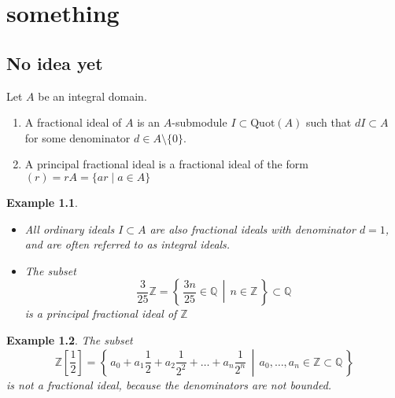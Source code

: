 \documentclass[a4paper]{book}
\theoremstyle{break}
\newtheorem{example}{Example}
\theoremstyle{plain}
\begin{document}
\chapter{something}

\section{No idea yet}

\begin{definition}
    Let \(A\) be an {\color{mathif}integral domain}.
    \begin{enumerate}
        \item A {\color{maththen}fractional ideal} of \(A\) is an {\color{mathif}\(A\)-submodule} \(I \subset \text{Quot}(A)\) such that \(d I \subset A\) for some {\color{mathrem}denominator} \(d \in A \setminus \{0\}\).
        \item A {\color{maththen}principal fractional ideal} is a {\color{mathif}fractional ideal} of the form \((r) = rA = \{ar \mid a \in A\}\)
    \end{enumerate}
\end{definition}

\begin{example}
    \begin{itemize}
        \item All ordinary ideals \(I \subset A\) are also fractional ideals with denominator \(d = 1\), and are often referred to as {\color{mathrem}integral ideals}.
        \item The subset
        \begin{equation}
            \frac{3}{25}\mathbb{Z} = \left\{\, \frac{3n}{25} \in \mathbb{Q} \,\middle|\, n \in \mathbb{Z} \,\right\} \subset \mathbb{Q}
        \end{equation}
        is a principal fractional ideal of \(\mathbb{Z}\)
    \end{itemize}
\end{example}

\begin{example}
    The subset
    \begin{equation}
        \mathbb{Z}\left[\frac{1}{2}\right] = \left\{\, a_0 + a_1 \frac{1}{2} + a_2 \frac{1}{2^2} + \dots + a_n \frac{1}{2^n} \,\middle|\, a_0, \dots, a_n \in \mathbb{Z} \subset \mathbb{Q} \,\right\}
    \end{equation}
    is not a fractional ideal, because the denominators are not bounded.
\end{example}
\end{document}
